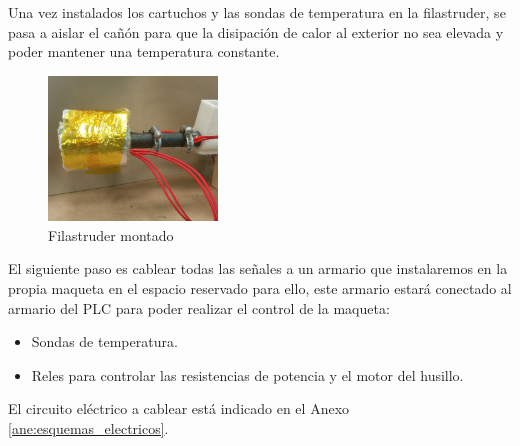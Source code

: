 Una vez instalados los cartuchos y las sondas de temperatura en la filastruder, se pasa a aislar el cañón para que la disipación de calor al exterior no sea elevada y poder mantener una temperatura constante.\\

    \begin{figure}[H]
            \centering
            \includegraphics[width=0.4\textwidth]{images/filaextruder/IMG_20150814_132929.jpg}
            \caption{Filastruder montado}
            \label{fig:fila_montaje4}
    \end{figure}

El siguiente paso es cablear todas las señales a un armario que instalaremos en la propia maqueta en el espacio reservado para ello, este armario estará conectado al armario del PLC para poder realizar el control de la maqueta:\\

    \begin{itemize}
    	\item Sondas de temperatura.
    	\item Reles para controlar las resistencias de potencia y el motor del husillo.
    \end{itemize}

El circuito eléctrico a cablear está indicado en el Anexo \ref{ane:esquemas_electricos}.\\

